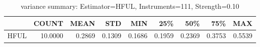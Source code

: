\begin{table}[ht]
\centering
\caption{variance summary: Estimator=HFUL, Instruments=111, Strength=0.10}
\begin{tabular}{lrrrrrrrr}
\toprule
 & COUNT & MEAN & STD & MIN & 25\% & 50\% & 75\% & MAX \\
\midrule
HFUL & 10.0000 & 0.2869 & 0.1309 & 0.1686 & 0.1959 & 0.2369 & 0.3753 & 0.5539 \\
\bottomrule
\end{tabular}
\end{table}

